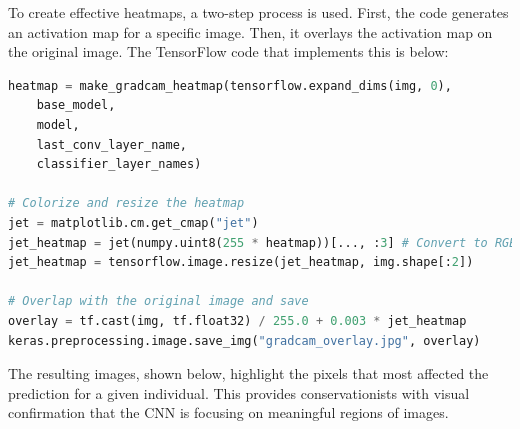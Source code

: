 \documentclass[twocolumn]{article}
\begin{document}
To create effective heatmaps, a two-step process is used. First, the code generates an activation map for a specific image. Then, it overlays the activation map on the original image. The TensorFlow code that implements this is below:

\begin{lstlisting}[language=Python,basicstyle=\footnotesize\ttfamily]
heatmap = make_gradcam_heatmap(tensorflow.expand_dims(img, 0),
    base_model,
    model,
    last_conv_layer_name,
    classifier_layer_names)

# Colorize and resize the heatmap
jet = matplotlib.cm.get_cmap("jet")
jet_heatmap = jet(numpy.uint8(255 * heatmap))[..., :3] # Convert to RGB
jet_heatmap = tensorflow.image.resize(jet_heatmap, img.shape[:2])

# Overlap with the original image and save
overlay = tf.cast(img, tf.float32) / 255.0 + 0.003 * jet_heatmap
keras.preprocessing.image.save_img("gradcam_overlay.jpg", overlay)
\end{lstlisting}
The resulting images, shown below, highlight the pixels that most affected the prediction for a given individual. This provides conservationists with visual confirmation that the CNN is focusing on meaningful regions of images.
\end{document}
